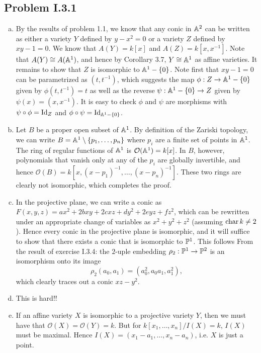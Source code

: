 \documentclass{../mathnotes}
\begin{document}
\subsection*{Problem I.3.1}
\begin{enumerate}[(a)]
    \item By the results of problem 1.1, we know that any conic in $\mathbb{A}^2$ can be written as either
        a variety $Y$ defined by $y-x^2=0$ or a variety $Z$ defined by $xy-1=0$. We know that
        $A(Y)=k[x]$ and $A(Z)=k[x,x^{-1}]$. Note that $A(Y)\cong A(\mathbb{A}^1)$, and hence by Corollary
        3.7, $Y\cong\mathbb{A}^1$ as affine varieties. It remains to show that $Z$ is isomorphic to
        $\mathbb{A}^1-\{0\}$. Note first that $xy-1=0$ can be parametrized as $(t,t^{-1})$, which
        suggests the map $\phi:Z\to\mathbb{A}^1-\{0\}$ given by $\phi(t,t^{-1})=t$ as well as the reverse
        $\psi:\mathbb{A}^1-\{0\}\to Z$ given by $\psi(x)=(x,x^{-1})$. It is easy to check $\phi$ and $\psi$
        are morphisms with $\psi\circ\phi=\operatorname{Id}_Z$ and $\phi\circ\psi=\operatorname{Id}_{\mathbb{A}^1-\{0\}}$.
    \item Let $B$ be a proper open subset of $\mathbb{A}^1$. By definition of the Zariski topology, we can
        write $B=\mathbb{A}^1\setminus\{p_1,\ldots, p_n\}$ where $p_i$ are a finite set of points in $\mathbb{A}^1$.
        The ring of regular functions of $\mathbb{A}^1$ is $\mathcal{O}(\mathbb{A}^1)=k[x]$. In $B$, however,
        polynomials that vanish only at any of the $p_i$ are globally invertible, and hence
        $\mathcal{O}(B)=k[x,(x-p_1)^{-1},\ldots,(x-p_n)^{-1}]$. These two rings are clearly
        not isomorphic, which completes the proof.
    \item In the projective plane, we can write a conic as $F(x,y,z)=ax^2+2bxy+2cxz+dy^2+2eyz+fz^2$,
        which can be rewritten under an appropriate change of variables as $x^2+y^2+z^2$ (assuming
        $\operatorname{char} k\neq 2$). Hence every
        conic in the projective plane is isomorphic, and it will suffice to show that there exists
        a conic that is isomorphic to $\mathbb{P}^1$.
        This follows From the result of exercise I.3.4: the $2$-uple embedding 
        $\rho_2:\mathbb{P}^1\to\mathbb{P}^2$ is an isomorphism onto its image
        \[\rho_2(a_0,a_1)=(a_0^2,a_0a_1,a_1^2),\]
        which clearly traces out a conic $xz-y^2$.
    \item This is hard!! 
    \item If an affine variety $X$ is isomorphic to a projective variety $Y$, then we must have
        that $\mathcal{O}(X)=\mathcal{O}(Y)=k$. But for $k[x_1,\ldots,x_n]/I(X)=k$, $I(X)$
        must be maximal. Hence $I(X)=(x_1-a_1,\ldots,x_n-a_n)$, i.e. $X$ is just a point.
\end{enumerate}
\end{document}
